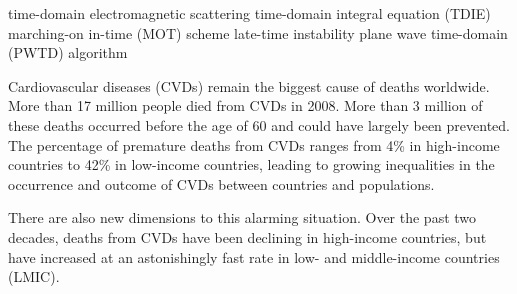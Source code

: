 
\begin{Eabstract}%
{time-domain electromagnetic scattering}%
{time-domain integral equation (TDIE)}%
{marching-on in-time (MOT) scheme}%
{late-time instability}%
{plane wave time-domain (PWTD) algorithm}

Cardiovascular diseases (CVDs) remain the biggest cause of deaths worldwide.
More than 17 million people died from CVDs in 2008.
More than 3 million of these deaths occurred before the
age of 60 and could have largely been prevented.
The percentage of premature deaths from CVDs ranges from 4\% in high-income
countries to 42\% in low-income countries, leading to growing
inequalities in the occurrence and outcome of CVDs between
countries and populations.

There are also new dimensions to this alarming situation. Over
the past two decades, deaths from CVDs have been declining in
high-income countries, but have increased at an astonishingly
fast rate in low- and middle-income countries (LMIC).
\end{Eabstract}
